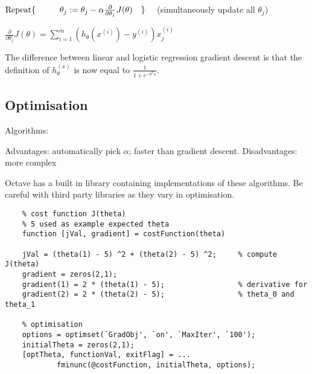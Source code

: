 \documentclass[12pt, a4paper]{article}
\begin{document}
    $\text{Repeat} \{\\ \-\hspace{1cm} \theta_j := \theta_j - 
      \alpha\frac{\partial}{\partial\theta_j}J(\theta)\\
      \hspace{1em} \}  \hspace{1em}$ (simultaneously update all $\theta_j$) 

    $\frac{\partial}{\partial\theta_j}J(\theta) =
    \displaystyle\sum_{i=1}^m (h_\theta(x^{(i)}) - y^{(i)})x_j^{(i)}$

    The difference between linear and logistic regression gradient descent is 
    that the definition of $h_\theta^{(x)}$ is now equal to 
    $\frac{1}{1+e^{-\theta^Tx}}$.
  
  \subsection{Optimisation}

    Algorithms:

    Advantages: automatically pick $\alpha$; faster than gradient descent.
    Disadvantages: more complex

    Octave has a built in library containing implementations of these algorithms.
    Be careful with third party libraries as they vary in optimisation. 

    \begin{lstlisting}
    % cost function J(theta)
    % 5 used as example expected theta
    function [jVal, gradient] = costFunction(theta)

    jVal = (theta(1) - 5) ^2 + (theta(2) - 5) ^2;     % compute J(theta)
    gradient = zeros(2,1);                            
    gradient(1) = 2 * (theta(1) - 5);                 % derivative for
    gradient(2) = 2 * (theta(2) - 5);                 % theta_0 and theta_1

    % optimisation
    options = optimset(`GradObj', `on', `MaxIter', `100');
    initialTheta = zeros(2,1);
    [optTheta, functionVal, exitFlag] = ...
            fminunc(@costFunction, initialTheta, options);
    \end{lstlisting}
\end{document}
